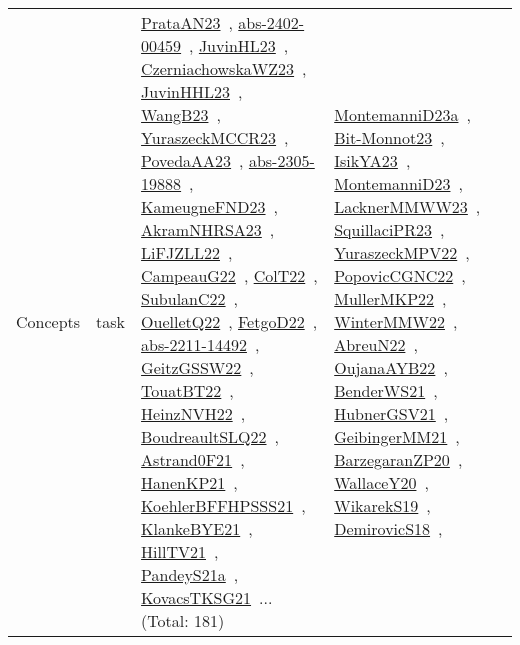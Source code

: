 {\begin{longtable}{lp{3cm}>{\raggedright\arraybackslash}p{6cm}>{\raggedright\arraybackslash}p{6cm}>{\raggedright\arraybackslash}p{8cm}}
Concepts & task & \href{articles/PrataAN23.pdf}{PrataAN23}~\cite{PrataAN23}, \href{articles/abs-2402-00459.pdf}{abs-2402-00459}~\cite{abs-2402-00459}, \href{papers/JuvinHL23.pdf}{JuvinHL23}~\cite{JuvinHL23}, \href{articles/CzerniachowskaWZ23.pdf}{CzerniachowskaWZ23}~\cite{CzerniachowskaWZ23}, \href{papers/JuvinHHL23.pdf}{JuvinHHL23}~\cite{JuvinHHL23}, \href{papers/WangB23.pdf}{WangB23}~\cite{WangB23}, \href{articles/YuraszeckMCCR23.pdf}{YuraszeckMCCR23}~\cite{YuraszeckMCCR23}, \href{papers/PovedaAA23.pdf}{PovedaAA23}~\cite{PovedaAA23}, \href{articles/abs-2305-19888.pdf}{abs-2305-19888}~\cite{abs-2305-19888}, \href{papers/KameugneFND23.pdf}{KameugneFND23}~\cite{KameugneFND23}, \href{articles/AkramNHRSA23.pdf}{AkramNHRSA23}~\cite{AkramNHRSA23}, \href{papers/LiFJZLL22.pdf}{LiFJZLL22}~\cite{LiFJZLL22}, \href{articles/CampeauG22.pdf}{CampeauG22}~\cite{CampeauG22}, \href{articles/ColT22.pdf}{ColT22}~\cite{ColT22}, \href{articles/SubulanC22.pdf}{SubulanC22}~\cite{SubulanC22}, \href{papers/OuelletQ22.pdf}{OuelletQ22}~\cite{OuelletQ22}, \href{articles/FetgoD22.pdf}{FetgoD22}~\cite{FetgoD22}, \href{articles/abs-2211-14492.pdf}{abs-2211-14492}~\cite{abs-2211-14492}, \href{papers/GeitzGSSW22.pdf}{GeitzGSSW22}~\cite{GeitzGSSW22}, \href{papers/TouatBT22.pdf}{TouatBT22}~\cite{TouatBT22}, \href{articles/HeinzNVH22.pdf}{HeinzNVH22}~\cite{HeinzNVH22}, \href{papers/BoudreaultSLQ22.pdf}{BoudreaultSLQ22}~\cite{BoudreaultSLQ22}, \href{papers/Astrand0F21.pdf}{Astrand0F21}~\cite{Astrand0F21}, \href{papers/HanenKP21.pdf}{HanenKP21}~\cite{HanenKP21}, \href{articles/KoehlerBFFHPSSS21.pdf}{KoehlerBFFHPSSS21}~\cite{KoehlerBFFHPSSS21}, \href{papers/KlankeBYE21.pdf}{KlankeBYE21}~\cite{KlankeBYE21}, \href{papers/HillTV21.pdf}{HillTV21}~\cite{HillTV21}, \href{articles/PandeyS21a.pdf}{PandeyS21a}~\cite{PandeyS21a}, \href{papers/KovacsTKSG21.pdf}{KovacsTKSG21}~\cite{KovacsTKSG21}... (Total: 181) & \href{articles/MontemanniD23a.pdf}{MontemanniD23a}~\cite{MontemanniD23a}, \href{papers/Bit-Monnot23.pdf}{Bit-Monnot23}~\cite{Bit-Monnot23}, \href{articles/IsikYA23.pdf}{IsikYA23}~\cite{IsikYA23}, \href{articles/MontemanniD23.pdf}{MontemanniD23}~\cite{MontemanniD23}, \href{articles/LacknerMMWW23.pdf}{LacknerMMWW23}~\cite{LacknerMMWW23}, \href{papers/SquillaciPR23.pdf}{SquillaciPR23}~\cite{SquillaciPR23}, \href{articles/YuraszeckMPV22.pdf}{YuraszeckMPV22}~\cite{YuraszeckMPV22}, \href{papers/PopovicCGNC22.pdf}{PopovicCGNC22}~\cite{PopovicCGNC22}, \href{articles/MullerMKP22.pdf}{MullerMKP22}~\cite{MullerMKP22}, \href{papers/WinterMMW22.pdf}{WinterMMW22}~\cite{WinterMMW22}, \href{articles/AbreuN22.pdf}{AbreuN22}~\cite{AbreuN22}, \href{papers/OujanaAYB22.pdf}{OujanaAYB22}~\cite{OujanaAYB22}, \href{papers/BenderWS21.pdf}{BenderWS21}~\cite{BenderWS21}, \href{articles/HubnerGSV21.pdf}{HubnerGSV21}~\cite{HubnerGSV21}, \href{papers/GeibingerMM21.pdf}{GeibingerMM21}~\cite{GeibingerMM21}, \href{papers/BarzegaranZP20.pdf}{BarzegaranZP20}~\cite{BarzegaranZP20}, \href{articles/WallaceY20.pdf}{WallaceY20}~\cite{WallaceY20}, \href{articles/WikarekS19.pdf}{WikarekS19}~\cite{WikarekS19}, \href{papers/DemirovicS18.pdf}{DemirovicS18}~\cite{DemirovicS18}, 
\end{longtable}}
